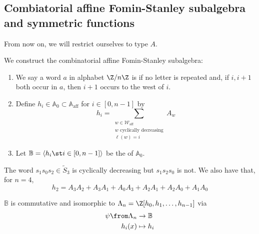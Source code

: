 \documentclass[11pt,leqno,oneside]{amsart}
\numberwithin{thm}{section}
\renewcommand{\W}{\mathcal{W}}
\newcommand{\Waff}{\W_{\text{aff}}}
\newcommand{\A}{\mathbb{A}}
\newcommand{\Aaff}{\A_{\text{aff}}}
\newcommand{\B}{\mathbb{B}}
\newcommand{\eS}{\tilde{S}}
\newcommand{\sym}{\Lambda}
\begin{document}
\subsection{Combiatorial affine Fomin-Stanley subalgebra and symmetric
  functions}
From now on, we will restrict ourselves to type \(A\).
\begin{defn}
  We construct the combinatorial affine Fomin-Stanley subalgebra:
  \begin{enumerate}
  \item We say a word \(a\) in alphabet \(\Z/n\Z\) is  if no letter is repeated and, if \(i,i+1\) both
    occur in \(a\), then \(i+1\) occurs to the west of \(i\). 
  \item Define \(h_i \in \A_0 \subset \Aaff\) for \(i \in [0,n-1]\) by
    \[
      h_i = \sum_{\substack{w \in \Waff \\ w \text{ cyclically decreasing} \\ \ell(w) = i}} A_w
    \]
  \item Let \(\B = \langle h_i \st i \in [0,n-1] \rangle\) be the
     of \(\A_0\).
  \end{enumerate}
\end{defn}
\begin{example}
  The word \(s_1s_0s_2 \in \eS_3\) is cyclically decreasing but \(s_1
  s_2 s_0\) is not. We also have that, for \(n=4\), \[
    h_2 = A_3 A_2 + A_3 A_1 + A_0 A_3 + A_2 A_1 + A_2 A_0 + A_1 A_0
  \]
\end{example}
\begin{prop}
  \(\B\) is commutative and isomorphic to \(\sym_n =
  \Z[h_0,h_1,\ldots,h_{n-1}]\) via
  \begin{align*}
    \psi \from \sym_n & \to \B \\
    h_i(x) & \mapsto h_i
  \end{align*}
\end{prop}
\end{document}

